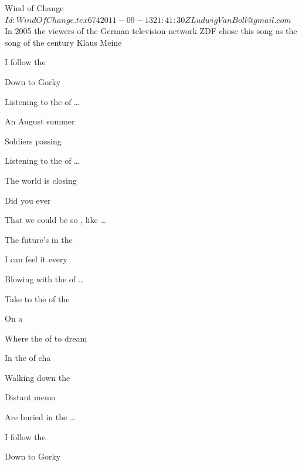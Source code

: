 \begin{SBSong}{Wind of Change}
  {$Id: WindOfChange.tex 674 2011-09-13 21:41:30Z LudwigVanBoll@gmail.com $}
  {In 2005 the viewers of the German television network ZDF chose this song as the song of the century}
  {Klaus Meine}
  \begin{SBVerse}
     I follow the 

    Down to Gorky 

    Listening to the  of \ldots{} 

     An August summer 

    Soldiers passing 

    Listening to the  of \ldots{} 
  \end{SBVerse}
  \begin{SBVerse}
     The world is closing 

    Did you ever 

    That we could be so , like \ldots{} 

     The future's in the 

    I can feel it every

    Blowing with the  of \ldots{} 
  \end{SBVerse}
  \begin{SBChorus}
     Take  to the  of the 

    On a  

    Where the  of to dream 

    In the  of cha
  \end{SBChorus}
  \begin{SBVerse}    
     Walking down the 
    
    Distant memo

    Are buried in the  \ldots{}

     I follow the 

    Down to Gorky 


\end{SBVerse}
\end{SBSong}
